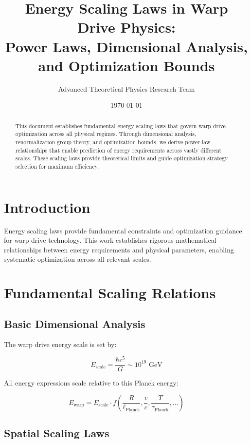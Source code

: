\documentclass[12pt,a4paper]{article}
\title{Energy Scaling Laws in Warp Drive Physics:\\Power Laws, Dimensional Analysis, and Optimization Bounds}
\author{Advanced Theoretical Physics Research Team}
\date{\today}
\begin{document}
\maketitle

\begin{abstract}
This document establishes fundamental energy scaling laws that govern warp drive optimization across all physical regimes. Through dimensional analysis, renormalization group theory, and optimization bounds, we derive power-law relationships that enable prediction of energy requirements across vastly different scales. These scaling laws provide theoretical limits and guide optimization strategy selection for maximum efficiency.
\end{abstract}

\section{Introduction}

Energy scaling laws provide fundamental constraints and optimization guidance for warp drive technology. This work establishes rigorous mathematical relationships between energy requirements and physical parameters, enabling systematic optimization across all relevant scales.

\section{Fundamental Scaling Relations}

\subsection{Basic Dimensional Analysis}

The warp drive energy scale is set by:

\begin{equation}
E_{\text{scale}} = \frac{\hbar c^5}{G} \sim 10^{19} \text{ GeV}
\end{equation}

All energy expressions scale relative to this Planck energy:

\begin{equation}
E_{\text{warp}} = E_{\text{scale}} \cdot f\left(\frac{R}{\ell_{\text{Planck}}}, \frac{v}{c}, \frac{T}{\tau_{\text{Planck}}}, \ldots\right)
\end{equation}

\subsection{Spatial Scaling Laws}
\end{document}
